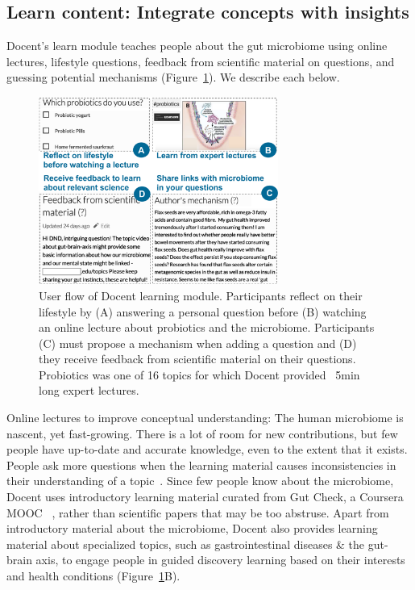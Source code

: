 \subsection{Learn content: Integrate concepts with insights}
Docent’s learn module teaches people about the gut microbiome using online lectures, lifestyle questions, feedback from scientific material on questions, and guessing potential mechanisms (Figure~\ref{fig:docent-2}). We describe each below. 

\begin{figure}[h] 
  \centering
  \includegraphics[width=0.7\textwidth]{figures/docent/fig-2.png}
  \caption[User flow of Docent learning module]
{User flow of Docent learning module. Participants reflect on their lifestyle by (A) answering a personal question before (B) watching an online lecture about probiotics and the microbiome. Participants (C) must propose a mechanism when adding a question and (D) they receive feedback from scientific material on their questions. Probiotics was one of 16 topics for which Docent provided ~5min long expert lectures.}
  \label{fig:docent-2}
\end{figure}

Online lectures to improve conceptual understanding: The human microbiome is nascent, yet fast-growing. There is a lot of room for new contributions, but few people have up-to-date and accurate knowledge, even to the extent that it exists. People ask more questions when the learning material causes inconsistencies in their understanding of a topic~\cite{Miyake1979a}. Since few people know about the microbiome, Docent uses introductory learning material curated from Gut Check, a Coursera MOOC ~\cite{Knight2016}, rather than scientific papers that may be too abstruse. Apart from introductory material about the microbiome, Docent also provides learning material about specialized topics, such as gastrointestinal diseases \& the gut-brain axis, to engage people in guided discovery learning based on their interests and health conditions (Figure~\ref{fig:docent-2}B).

